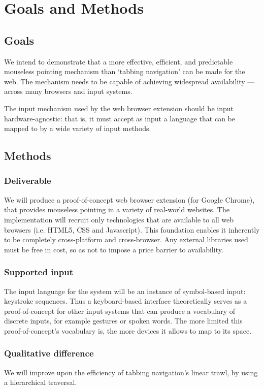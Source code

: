 \documentclass[a4paper, 12pt]{report}
\begin{document}
\section{Goals and Methods}
\subsection{Goals}
We intend to demonstrate that a more effective, efficient, and predictable mouseless pointing mechanism than `tabbing navigation' can be made for the web. The mechanism needs to be capable of achieving widespread availability --- across many browsers and input systems.

The input mechanism used by the web browser extension should be input hardware-agnostic: that is, it must accept as input a language that can be mapped to by a wide variety of input methods.

\subsection{Methods}
\subsubsection{Deliverable}
We will produce a proof-of-concept web browser extension (for Google Chrome), that provides mouseless pointing in a variety of real-world websites. The implementation will recruit only technologies that are available to all web browsers (i.e. HTML5, CSS and Javascript). This foundation enables it inherently to be completely cross-platform and cross-browser. Any external libraries used must be free in cost, so as not to impose a price barrier to availability.

\subsubsection{Supported input}
The input language for the system will be an instance of symbol-based input: keystroke sequences. Thus a keyboard-based interface theoretically serves as a proof-of-concept for other input systems that can produce a vocabulary of discrete inputs, for example gestures or spoken words. The more limited this proof-of-concept's vocabulary is, the more devices it allows to map to its space.

\subsubsection{Qualitative difference}
We will improve upon the efficiency of tabbing navigation's linear trawl, by using a hierarchical traversal.
\end{document}
